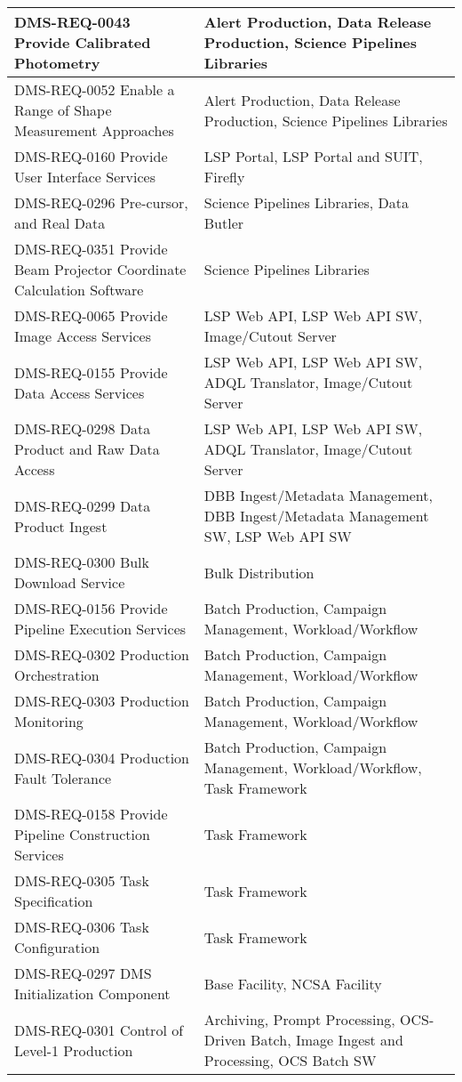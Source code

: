 \begin{longtable}{p{}p{}}
DMS-REQ-0043 Provide Calibrated Photometry & Alert Production, Data Release Production, Science Pipelines Libraries \\ \hline
DMS-REQ-0052 Enable a Range of Shape Measurement Approaches & Alert Production, Data Release Production, Science Pipelines Libraries \\ \hline
DMS-REQ-0160 Provide User Interface Services & LSP Portal, LSP Portal and SUIT, Firefly \\ \hline
DMS-REQ-0296 Pre-cursor, and Real Data & Science Pipelines Libraries, Data Butler \\ \hline
DMS-REQ-0351 Provide Beam Projector Coordinate Calculation Software & Science Pipelines Libraries \\ \hline
DMS-REQ-0065 Provide Image Access Services & LSP Web API, LSP Web API SW, Image/Cutout Server \\ \hline
DMS-REQ-0155 Provide Data Access Services & LSP Web API, LSP Web API SW, ADQL Translator, Image/Cutout Server \\ \hline
DMS-REQ-0298 Data Product and Raw Data Access & LSP Web API, LSP Web API SW, ADQL Translator, Image/Cutout Server \\ \hline
DMS-REQ-0299 Data Product Ingest & DBB Ingest/Metadata Management, DBB Ingest/Metadata Management SW, LSP Web API SW \\ \hline
DMS-REQ-0300 Bulk Download Service & Bulk Distribution \\ \hline
DMS-REQ-0156 Provide Pipeline Execution Services & Batch Production, Campaign Management, Workload/Workflow \\ \hline
DMS-REQ-0302 Production Orchestration & Batch Production, Campaign Management, Workload/Workflow \\ \hline
DMS-REQ-0303 Production Monitoring & Batch Production, Campaign Management, Workload/Workflow \\ \hline
DMS-REQ-0304 Production Fault Tolerance & Batch Production, Campaign Management, Workload/Workflow, Task Framework \\ \hline
DMS-REQ-0158 Provide Pipeline Construction Services & Task Framework \\ \hline
DMS-REQ-0305 Task Specification & Task Framework \\ \hline
DMS-REQ-0306 Task Configuration & Task Framework \\ \hline
DMS-REQ-0297 DMS Initialization Component & Base Facility, NCSA Facility \\ \hline
DMS-REQ-0301 Control of Level-1 Production & Archiving, Prompt Processing, OCS-Driven Batch, Image Ingest and Processing, OCS Batch SW \\ \hline

\end{longtable}
